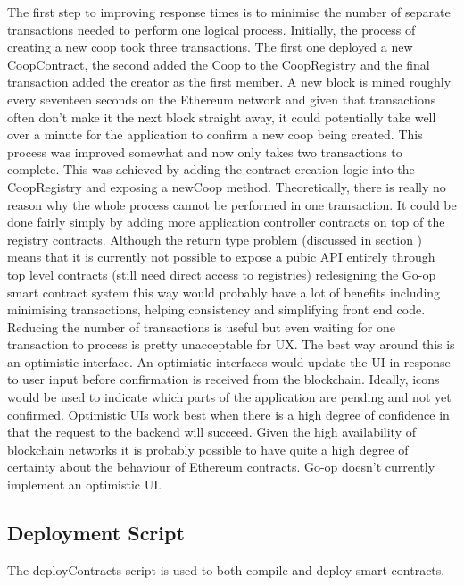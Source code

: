 The first step to improving response times is to minimise the number of separate transactions needed to perform one logical process. Initially, the process of creating a new coop took three transactions. The first one deployed a new CoopContract, the second added the Coop to the CoopRegistry and the final transaction added the creator as the first member. A new block is mined roughly every seventeen seconds on the Ethereum network and given that transactions often don't make it the next block straight away, it could potentially take well over a minute for the application to confirm a new coop being created. This process was improved somewhat and now only takes two transactions to complete. This was achieved by adding the contract creation logic into the CoopRegistry and exposing a newCoop method. Theoretically, there is really no reason why the whole process cannot be performed in one transaction. It could be done fairly simply by adding more application controller contracts on top of the registry contracts. Although the return type problem (discussed in section ) means that it is currently not possible to expose a pubic API entirely through top level contracts (still need direct access to registries) redesigning the Go-op smart contract system this way would probably have a lot of benefits including minimising transactions, helping consistency and simplifying front end code.\\

Reducing the number of transactions is useful but even waiting for one transaction to process is pretty unacceptable for UX. The best way around this is an optimistic interface. An optimistic interfaces would update the UI in response to user input before confirmation is received from the blockchain. Ideally, icons would be used to indicate which parts of the application are pending and not yet confirmed. Optimistic UIs work best when there is a high degree of confidence in that the request to the backend will succeed. Given the high availability of blockchain networks it is probably possible to have quite a high degree of certainty about the behaviour of Ethereum contracts. Go-op doesn't currently implement an optimistic UI.\\

\subsection{Deployment Script}
\label{subsec:deployScript}
The deployContracts script is used to both compile and deploy smart contracts. \\

